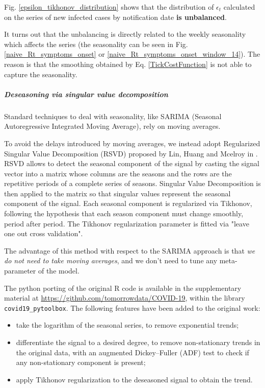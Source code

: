 \documentclass[graybox]{svmult}
\begin{document}
Fig. \ref{epsilon_tikhonov_distribution} shows that the distribution of $\epsilon_t$ calculated on the series of new infected cases by notification date \textbf{is unbalanced}.

It turns out that the unbalancing is directly related to the weekly seasonality which affects the series (the seasonality can be seen in Fig. \ref{naive_Rt_symptoms_onset} or \ref{naive_Rt_symptoms_onset_window_14}). The reason is that the smoothing obtained by Eq. \ref{TickCostFunction} is not able to capture the seasonality. 

\subparagraph{Deseasoning via singular value decomposition}
\label{RSVD}

Standard techniques to deal with seasonality, like SARIMA (Seasonal Autoregressive Integrated Moving Average), rely on moving averages. 

To avoid the delays introduced by moving averages, we instead adopt 
Regularized Singular Value Decomposition (RSVD) proposed by Lin, Huang and Mcelroy in \cite{LinHuangMcelroy}. RSVD allows to detect the seasonal component of the signal by casting the signal vector into a matrix whose columns are the seasons and the rows are the repetitive periods of a complete series of seasons. Singular Value Decomposition is then applied to the matrix so that singular values represent the seasonal component of the signal. Each seasonal component is regularized via Tikhonov, following the hypothesis that each season component must change smoothly, period after period. The Tikhonov regularization parameter is fitted via "leave one out cross validation".

The advantage of this method with respect to the SARIMA approach is that \emph{we do not need to take moving averages}, and we don't need to tune any meta-parameter of the model.

The python porting of the original R code is available in the supplementary material at \href{https://github.com/tomorrowdata/COVID-19}{https://github.com/tomorrowdata/COVID-19}, within the library \texttt{covid19\_pytoolbox}. The following features have been added to the original work:
\begin{itemize}
    \item take the logarithm of the seasonal series, to remove exponential trends;
    \item differentiate the signal to a desired degree, to remove non-stationary trends in the original data, with an augmented Dickey–Fuller (ADF) test to check if any non-stationary component is present;
    \item apply Tikhonov regularization to the deseasoned signal to obtain the trend.
\end{itemize}
\end{document}
